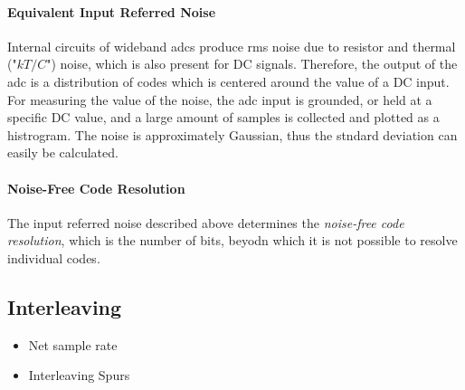 \paragraph{Equivalent Input Referred Noise}
Internal circuits of wideband \glspl{adc} produce rms noise due to resistor and thermal ("$kT/C$") noise, which is also present for DC signals. Therefore, the output of the \gls{adc} is a distribution of codes which is centered around the value of a DC input. For measuring the value of the noise, the \gls{adc} input is grounded, or held at a specific DC value, and a large amount of samples is collected and plotted as a histrogram. The noise is approximately Gaussian, thus the stndard deviation can easily be calculated.

\paragraph{Noise-Free Code Resolution}
The input referred noise described above determines the \textit{noise-free code resolution}, which is the number of bits, beyodn which it is not possible to resolve individual codes.
\cite{walt}


\subsection{Interleaving}

\begin{itemize}
	\item Net sample rate
	\item Interleaving Spurs
\end{itemize}
